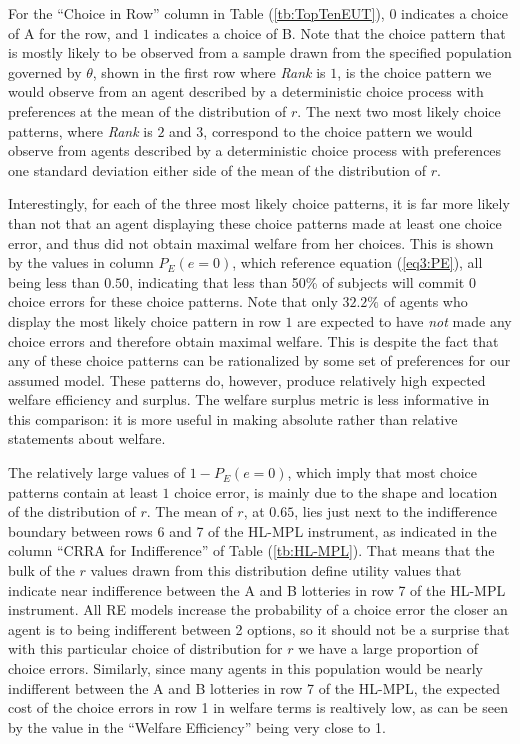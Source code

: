 \documentclass[../main.tex]{subfiles}
\begin{document}
For the \enquote{Choice in Row} column in Table (\ref{tb:TopTenEUT}), $0$ indicates a choice of A for the row, and $1$ indicates a choice of B.
Note that the choice pattern that is mostly likely to be observed from a sample drawn from the specified population governed by $\theta$, shown in the first row where \textit{Rank} is $1$, is the choice pattern we would observe from an agent described by a deterministic choice process with preferences at the mean of the distribution of $r$.
The next two most likely choice patterns, where \textit{Rank} is $2$ and $3$, correspond to the choice pattern we would observe from agents described by a deterministic choice process with preferences one standard deviation either side of the mean of the distribution of $r$.

Interestingly, for each of the three most likely choice patterns, it is far more likely than not that an agent displaying these choice patterns made at least one choice error, and thus did not obtain maximal welfare from her choices.
This is shown by the values in column $P_E(e=0)$, which reference equation (\ref{eq3:PE}), all being less than $0.50$, indicating that less than 50\% of subjects will commit 0 choice errors for these choice patterns.
Note that only $32.2\%$ of agents who display the most likely choice pattern in row $1$ are expected to have \textit{not} made any choice errors and therefore obtain maximal welfare.
This is despite the fact that any of these choice patterns can be rationalized by some set of preferences for our assumed model.
These patterns do, however, produce relatively high expected welfare efficiency and surplus.
The welfare surplus metric is less informative in this comparison: it is more useful in making absolute rather than relative statements about welfare.

The relatively large values of $ 1 - P_E(e = 0)$, which imply that most choice patterns contain at least $1$ choice error, is mainly due to the shape and location of the distribution of $r$.
The mean of $r$, at $0.65$, lies just next to the indifference boundary between rows 6 and 7 of the HL-MPL instrument, as indicated in the column \enquote{CRRA for Indifference} of Table (\ref{tb:HL-MPL}).
That means that the bulk of the $r$ values drawn from this distribution define utility values that indicate near indifference between the A and B lotteries in row 7 of the HL-MPL instrument.
All RE models increase the probability of a choice error the closer an agent is to being indifferent between 2 options, so it should not be a surprise that with this particular choice of distribution for $r$ we have a large proportion of choice errors.
Similarly, since many agents in this population would be nearly indifferent between the A and B lotteries in row 7 of the HL-MPL, the expected cost of the choice errors in row 1 in welfare terms is realtively low, as can be seen by the value in the \enquote{Welfare Efficiency} being very close to 1.
\end{document}
